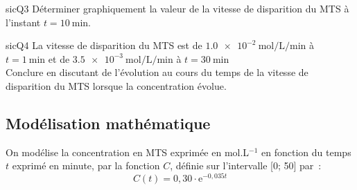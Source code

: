 \begin{questionmult}{sicQ3}
    Déterminer graphiquement la valeur de la vitesse de disparition du MTS à l'instant $t = \SI{10}{\minute}$.\\
    \begin{EnvQuadrillage}[NbCarreaux=14x2,Grille=Seyes,Marge=1]
    \end{EnvQuadrillage}
\end{questionmult}

\begin{questionmult}{sicQ4}
    La vitesse de disparition du MTS est de $\SI{1,0e-2}{\mol\per\liter\per\minute}$ à $t = \SI{1}{\minute}$ et de $\SI{3,5e-3}{\mol\per\liter\per\minute}$ à $t = \SI{30}{\minute}$\\
    Conclure en discutant de l'évolution au cours du temps de la vitesse de disparition du MTS lorsque la concentration évolue.\\
    \begin{EnvQuadrillage}[NbCarreaux=19x3,Grille=Seyes,Marge=1]
    \end{EnvQuadrillage}
\end{questionmult}

\subsection{Modélisation mathématique}

On modélise la concentration en MTS exprimée en mol.L$^{-1}$ en fonction du temps $t$ exprimé en minute, par la fonction $C$, définie sur l'intervalle [0; 50] par~:
$$
C(t) = 0,30 \cdot \mathrm{e}^{-0,035t}
$$

